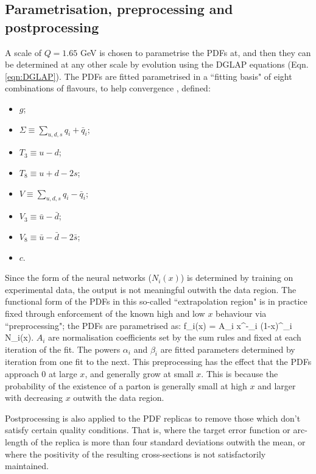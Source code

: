 \subsection{Parametrisation, preprocessing and postprocessing}
A scale of $Q=1.65$ GeV is chosen to parametrise the PDFs at, and then they can be determined at any other scale by evolution using the DGLAP equations (Eqn. \ref{eqn:DGLAP}). The PDFs are fitted parametrised in a ``fitting basis" of eight combinations of flavours, to help convergence \cite{Ball:2014uwa}, defined:
\begin{itemize}
\item $g$;
\item $\Sigma \equiv \sum_{u,d,s} q_i + \bar{q}_i$;
\item $T_3 \equiv u - d$;
\item $T_8 \equiv u + d - 2s$;
\item $V \equiv \sum_{u, d, s} q_i - \bar{q}_i$;
\item $V_3 \equiv \bar{u} - \bar{d}$;
\item $V_8 \equiv \bar{u} - \bar{d} - 2 \bar{s}$;
\item $c$.
\end{itemize}
Since the form of the neural networks ($N_i(x)$) is determined by training on experimental data, the output is not meaningful outwith the data region. The functional form of the PDFs in this so-called ``extrapolation region" is in practice fixed through enforcement of the known high and low $x$ behaviour via ``preprocessing"; the PDFs are parametrised as:
\beq
  f_i(x) = A_i x^{-\alpha_i} (1-x)^{\beta_i} N_i(x).
\eeq
$A_i$ are normalisation coefficients set by the sum rules and fixed at each iteration of the fit. The powers $\alpha_i$ and $\beta_i$ are fitted parameters determined by iteration from one fit to the next. This preprocessing has the effect that the PDFs approach 0 at large $x$, and generally grow at small $x$. This is because the probability of the existence of a parton is generally small at high $x$ and larger with decreasing $x$ outwith the data region.

Postprocessing is also applied to the PDF replicas to remove those which don't satisfy certain quality conditions. That is, where the target error function or arc-length of the replica is more than four standard deviations outwith the mean, or where the positivity of the resulting cross-sections is not satisfactorily maintained. 

